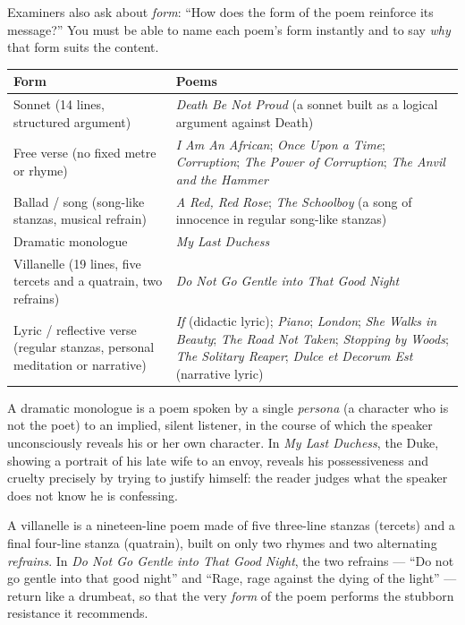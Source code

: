 \documentclass[11pt]{article}
\newcommand{\cle}[1]{{\popxbold\color{popdark}#1}}
\begin{document}
Examiners also ask about \emph{form}: ``How does the form of the poem reinforce its message?'' You must be able to name each poem's form instantly and to say \emph{why} that form suits the content.

\begin{center}
\begin{tabularx}{\linewidth}{|l|X|}
\hline
\rowcolor{popblueL} \textbf{Form} & \textbf{Poems} \\
\hline
\cle{Sonnet} (14 lines, structured argument) & \emph{Death Be Not Proud} (a sonnet built as a logical argument against Death) \\
\hline
\cle{Free verse} (no fixed metre or rhyme) & \emph{I Am An African}; \emph{Once Upon a Time}; \emph{Corruption}; \emph{The Power of Corruption}; \emph{The Anvil and the Hammer} \\
\hline
\cle{Ballad} / song (song-like stanzas, musical refrain) & \emph{A Red, Red Rose}; \emph{The Schoolboy} (a song of innocence in regular song-like stanzas) \\
\hline
\cle{Dramatic monologue} & \emph{My Last Duchess} \\
\hline
\cle{Villanelle} (19 lines, five tercets and a quatrain, two refrains) & \emph{Do Not Go Gentle into That Good Night} \\
\hline
Lyric / reflective verse (regular stanzas, personal meditation or narrative) & \emph{If} (didactic lyric); \emph{Piano}; \emph{London}; \emph{She Walks in Beauty}; \emph{The Road Not Taken}; \emph{Stopping by Woods}; \emph{The Solitary Reaper}; \emph{Dulce et Decorum Est} (narrative lyric) \\
\hline
\end{tabularx}
\end{center}

\begin{definition}
A \cle{dramatic monologue} is a poem spoken by a single \emph{persona} (a character who is not the poet) to an implied, silent listener, in the course of which the speaker unconsciously reveals his or her own character. In \emph{My Last Duchess}, the Duke, showing a portrait of his late wife to an envoy, reveals his possessiveness and cruelty precisely by trying to justify himself: the reader judges what the speaker does not know he is confessing.
\end{definition}

\begin{definition}[Villanelle]
A \cle{villanelle} is a nineteen-line poem made of five three-line stanzas (tercets) and a final four-line stanza (quatrain), built on only two rhymes and two alternating \emph{refrains}. In \emph{Do Not Go Gentle into That Good Night}, the two refrains — ``Do not go gentle into that good night'' and ``Rage, rage against the dying of the light'' — return like a drumbeat, so that the very \emph{form} of the poem performs the stubborn resistance it recommends.
\end{definition}
\end{document}
